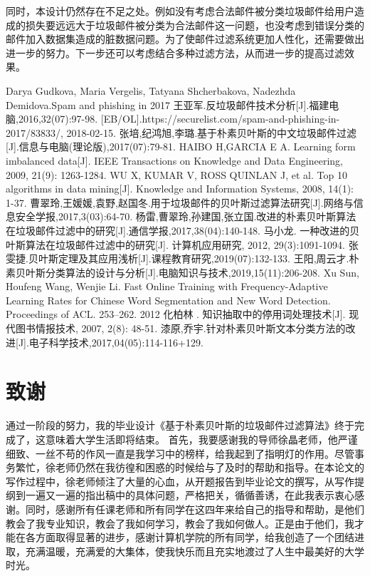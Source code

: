 \documentclass[UTF8,zihao=-4]{ctexart}
\begin{document}
	同时，本设计仍然存在不足之处。例如没有考虑合法邮件被分类垃圾邮件给用户造成的损失要远远大于垃圾邮件被分类为合法邮件这一问题，也没考虑到错误分类的邮件加入数据集造成的脏数据问题。为了使邮件过滤系统更加人性化，还需要做出进一步的努力。下一步还可以考虑结合多种过滤方法，从而进一步的提高过滤效果。
	
\newpage
\begin{thebibliography}{99}
  \linespread{1.25}\songti{}
  Darya Gudkova, Maria Vergelis, Tatyana Shcherbakova, Nadezhda Demidova.Spam and phishing in 2017
  王亚军.反垃圾邮件技术分析[J].福建电脑,2016,32(07):97-98.
  [EB/OL].https://securelist.com/spam-and-phishing-in-2017/83833/, 2018-02-15.
   张培,纪鸿旭,李璐.基于朴素贝叶斯的中文垃圾邮件过滤[J].信息与电脑(理论版),2017(07):79-81.
   HAIBO H,GARCIA E A. Learning form imbalanced data[J]. IEEE Transactions on Knowledge and Data Engineering, 2009, 21(9):
1263-1284.
   WU X, KUMAR V, ROSS QUINLAN J, et al. Top 10 algorithms in
data mining[J]. Knowledge and Information Systems, 2008, 14(1): 1-37.
    曹翠玲,王媛媛,袁野,赵国冬.用于垃圾邮件的贝叶斯过滤算法研究[J].网络与信息安全学报,2017,3(03):64-70.
   杨雷,曹翠玲,孙建国,张立国.改进的朴素贝叶斯算法在垃圾邮件过滤中的研究[J].通信学报,2017,38(04):140-148.
   马小龙. 一种改进的贝叶斯算法在垃圾邮件过滤中的研究[J].
计算机应用研究, 2012, 29(3):1091-1094.
   张雯捷.贝叶斯定理及其应用浅析[J].课程教育研究,2019(07):132-133.
   王阳,周云才.朴素贝叶斯分类算法的设计与分析[J].电脑知识与技术,2019,15(11):206-208.
	Xu Sun, Houfeng Wang, Wenjie Li. Fast Online Training with Frequency-Adaptive Learning Rates for Chinese Word Segmentation and New Word Detection. Proceedings of ACL. 253–262. 2012
	 化柏林	. 知识抽取中的停用词处理技术[J]. 现代图书情报技术, 2007, 2(8): 48-51.	
	 漆原,乔宇.针对朴素贝叶斯文本分类方法的改进[J].电子科学技术,2017,04(05):114-116+129.
\end{thebibliography}

\newpage
\section*{致谢}
	通过一阶段的努力，我的毕业设计《基于朴素贝叶斯的垃圾邮件过滤算法》终于完成了，这意味着大学生活即将结束。
	首先，我要感谢我的导师徐晶老师，他严谨细致、一丝不苟的作风一直是我学习中的榜样，给我起到了指明灯的作用。尽管事务繁忙，徐老师仍然在我彷徨和困惑的时候给与了及时的帮助和指导。在本论文的写作过程中，徐老师倾注了大量的心血，从开题报告到毕业论文的撰写，从写作提纲到一遍又一遍的指出稿中的具体问题，严格把关，循循善诱，在此我表示衷心感谢。同时，感谢所有任课老师和所有同学在这四年来给自己的指导和帮助，是他们教会了我专业知识，教会了我如何学习，教会了我如何做人。正是由于他们，我才能在各方面取得显著的进步，感谢计算机学院的所有同学，给我创造了一个团结进取，充满温暖，充满爱的大集体，使我快乐而且充实地渡过了人生中最美好的大学时光。
	
\end{document}
